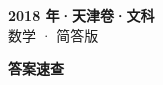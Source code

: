 \documentclass[zihao=-4, a4paper]{ctexart}
\begin{document}
\begin{center}
  {\Large\bfseries 2018 年·天津卷·文科}\\[4pt]
  {\large 数学 · 简答版}
\end{center}
\medskip
{}

\clearpage
{}
\begin{center}{\Large\bfseries 答案速查}\end{center}
\medskip

\end{document}
